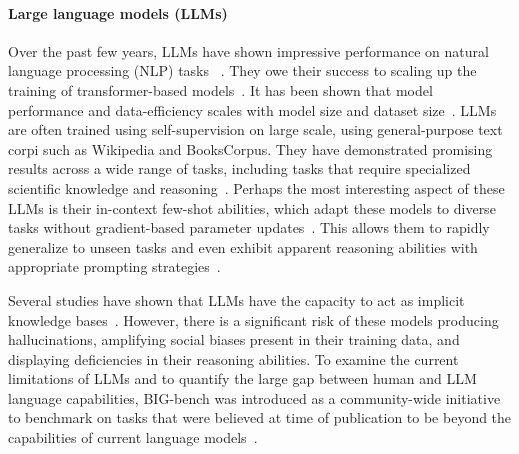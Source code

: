 \documentclass[10pt, letter, onecolumn]{arxiv}
\begin{document}
\begin{refsection}
\paragraph{Large language models (LLMs)} Over the past few years, LLMs have shown impressive performance on natural language processing (NLP) tasks ~\cite{brown2020language, chowdhery2022palm, chung2022scaling, hoffmann2022training, scao2022bloom, rae2021scaling, raffel2020exploring, wei2021finetuned, wei2022chain, zhang2022opt}. They owe their success to scaling up the training of transformer-based models~\cite{vaswani2017attention}. It has been shown that model performance and data-efficiency scales with model size and dataset size~\cite{kaplan2020scaling}. 
LLMs are often trained using self-supervision on large scale, using general-purpose text corpi such as Wikipedia and BooksCorpus. They have demonstrated promising results across a wide range of tasks, including tasks that require specialized scientific knowledge and reasoning~\cite{hendrycks2020measuring, cobbe2021training}. Perhaps the most interesting aspect of these LLMs is their in-context few-shot abilities, which adapt these models to diverse tasks without gradient-based parameter updates~\cite{brown2020language, lampinen2022can, kojima2022large, wei2021finetuned}. This allows them to rapidly generalize to unseen tasks and even exhibit apparent reasoning abilities with appropriate prompting strategies~\cite{chowdhery2022palm, lewkowycz2022solving, taylor2022galactica, wei2022chain}.  

Several studies have shown that LLMs have the capacity to act as implicit knowledge bases~\cite{joshi2017triviaqa, hendrycks2020measuring, taylor2022galactica}. However, there is a significant risk of these models producing hallucinations, amplifying social biases present in their training data, and displaying deficiencies in their reasoning abilities. To examine the current limitations of LLMs and to quantify the large gap between human and LLM language capabilities, BIG-bench was introduced as a community-wide initiative to benchmark on tasks that were believed at time of publication to be beyond the capabilities of current language models~\cite{srivastava2022beyond}. 


\end{refsection}
\end{document}
